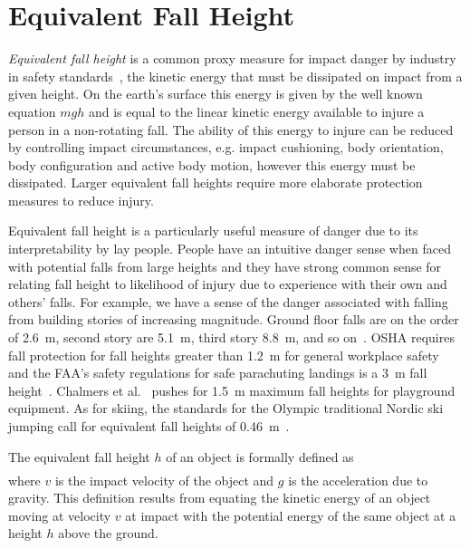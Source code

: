 \documentclass{article}
\begin{document}
\section{Equivalent Fall Height}
%
\emph{Equivalent fall height} is a common proxy measure for impact
danger by industry in safety standards~\cite{Hubbard2012}, the
kinetic energy that must be dissipated on impact from a given height. On the
earth's surface this energy is given by the well known equation $mgh$ and is
equal to the linear kinetic energy available to injure a person in a non-rotating fall. The ability of
this energy to injure can be reduced by controlling impact circumstances,
e.g. impact cushioning, body orientation, body configuration and active body
motion, however this energy must be dissipated. Larger equivalent fall
heights require more elaborate protection measures to reduce injury.

Equivalent fall height is a particularly useful measure of danger due to its
interpretability by lay people. People have an intuitive danger sense when faced
with potential falls from large heights and they have strong common sense for
relating fall height to likelihood of injury due to experience with their own 
and others' falls. For example, we have a sense of the danger
associated with falling from building stories of increasing magnitude. Ground
floor falls are on the order of 2.6~\si{\meter}, second story are
5.1~\si{\meter}, third story 8.8~\si{\meter}, and so on~\cite{Vish2005}. OSHA
requires fall protection for fall heights greater than 1.2~\si{\meter} for
general workplace safety~ and the FAA's safety regulations
for safe parachuting landings is a 3~\si{\meter} fall height~.  Chalmers et al.~\cite{Chalmers1996} pushes for 1.5~\si{\meter}
maximum fall heights for playground equipment. As for skiing, the standards for
the Olympic traditional Nordic ski jumping call for equivalent fall heights of
0.46~\si{\meter}~.

The equivalent fall height $h$ of an object is formally defined as
%
\begin{align}
  
  \label{eq:efh_general}
\end{align}
%
where $v$ is the impact velocity of the object and $g$ is the acceleration due
to gravity. This definition results from equating the kinetic energy of an
object moving at velocity $v$ at impact with the potential energy of the same
object at a height $h$ above the ground.
\end{document}
